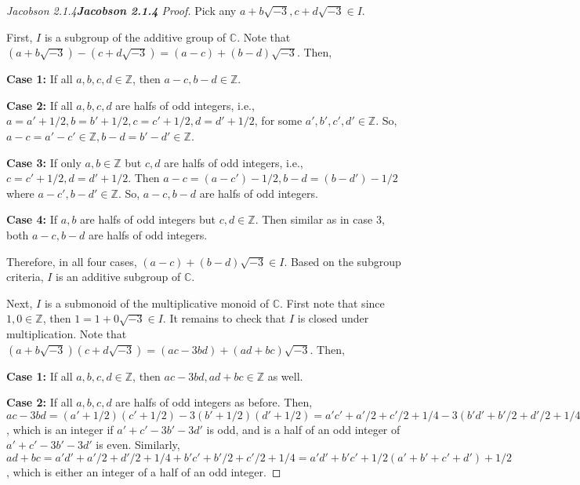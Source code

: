\documentclass[12pt]{article}
\newenvironment{fproof}[1][]
  {\begin{proof}[\ifx\relax#1\relax\else\textbf{\large #1} Proof\fi]}
  {\end{proof}}
\begin{document}
\newpage

\begin{fproof}[Jacobson 2.1.4]
  Pick any \(a + b \sqrt{-3}, c + d \sqrt{-3} \in I\).

  First, \(I\) is a subgroup of the additive group of \(\mathbb{C}\).
  Note that\((a + b \sqrt{-3}) - (c + d \sqrt{-3}) = (a-c) + (b-d) \sqrt{-3}\).
  Then,

  \textbf{Case 1:} If all \(a,b,c,d \in \mathbb{Z}\), then \(a-c, b-d \in \mathbb{Z}\).

  \textbf{Case 2:} If all \(a,b,c,d\) are halfs of odd integers, i.e., \(a = a' + 1/2, b = b' + 1/2, c = c' + 1/2, d = d' + 1/2\), for some \(a',b',c',d' \in \mathbb{Z}\).
  So, \(a-c = a'-c' \in \mathbb{Z}, b-d = b'-d' \in \mathbb{Z}\).

  \textbf{Case 3:} If only \(a,b \in \mathbb{Z}\) but \(c,d\) are halfs of odd integers, i.e., \(c = c' + 1/2, d = d' + 1/2\).
  Then \(a-c = (a-c') - 1/2, b-d = (b - d') - 1/2\) where \(a-c', b-d' \in \mathbb{Z}\). So, \(a-c, b-d\) are halfs of odd integers.

  \textbf{Case 4:} If \(a,b\) are halfs of odd integers but \(c,d \in \mathbb{Z}\). Then similar as in case 3, both \(a-c, b-d\) are halfs of odd integers.

  Therefore, in all four cases, \((a-c) + (b-d) \sqrt{-3} \in I\). Based on the subgroup criteria, \(I\) is an additive subgroup of \(\mathbb{C}\).

  Next, \(I\) is a submonoid of the multiplicative monoid of \(\mathbb{C}\).
  First note that since \(1, 0 \in \mathbb{Z}\), then \(1 = 1 + 0 \sqrt{-3} \in I\). It remains to check that \(I\) is closed under multiplication.
  Note that \((a + b \sqrt{-3})(c + d \sqrt{-3}) = (ac - 3bd) + (ad + bc) \sqrt{-3}\). Then,

  \textbf{Case 1:} If all \(a,b,c,d \in \mathbb{Z}\), then \(ac-3bd, ad+bc \in \mathbb{Z}\) as well.

  \textbf{Case 2:} If all \(a,b,c,d\) are halfs of odd integers as before. Then,
  \(ac - 3bd = (a' + 1/2)(c' + 1/2) - 3(b'+1/2)(d'+1/2) = a'c' + a'/2 + c'/2 + 1/4 - 3(b'd' + b'/2 + d'/2 + 1/4) = a'c'- 3b'd' + 1/2(a' + c' -3b' - 3d') - 1/2\), which is an integer if \(a' + c' -3b' - 3d'\) is odd, and is a half of an odd integer of \(a' + c' -3b' - 3d'\) is even. Similarly, \(ad + bc = a'd' + a'/2 + d'/2 + 1/4 + b'c' + b'/2 + c'/2 + 1/4 = a'd' + b'c' + 1/2(a' + b' + c' + d') + 1/2\), which is either an integer of a half of an odd integer.


\end{fproof}
\end{document}
